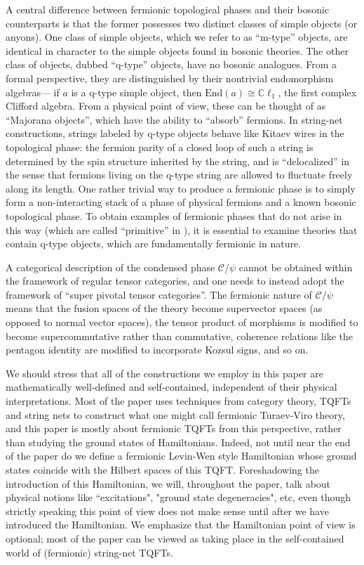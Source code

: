\documentclass[12pt,a4paper]{article}
\newcommand{\mcc}{\mathcal{C}}
\newcommand{\End}{\text{End}}
\newcommand{\cl}{\mathbb{C}\ell}
\begin{document}
A central difference between fermionic topological phases and their bosonic counterparts is that 
the former possesses two distinct classes of simple objects (or anyons). 
One class of simple objects, which we refer to as ``m-type'' objects, are identical in character
to the simple objects found in bosonic theories. 
The other class of objects, dubbed ``q-type'' objects, have no bosonic analogues. 
From a formal perspective, they are distinguished by their nontrivial endomorphism algebras---
if $a$ is a q-type simple object, then $\End(a) \cong \cl_1$, the first complex Clifford algebra. 
From a physical point of view, these can be thought of as ``Majorana objects'', which have the ability 
to ``absorb'' fermions. 
In string-net constructions, strings labeled by q-type objects behave like Kitaev wires in the 
topological phase: the fermion parity of a closed loop of such a string is determined by 
the spin structure inherited by the string, and is ``delocalized'' in the sense that fermions living on the q-type string are allowed to fluctuate freely along its length.
One rather trivial way to produce a fermionic phase is to simply form a non-interacting stack of a phase of physical fermions 
and a known bosonic topological phase. 
To obtain examples of fermionic phases that do not arise in this way (which are called ``primitive'' in \cite{Lan2016b}),
it is essential to examine theories that contain q-type objects, which are fundamentally fermionic in nature. 

A categorical description of the condensed phase $\mcc / \psi$ cannot be obtained within the framework 
of regular tensor categories, and one needs to instead adopt the framework of ``super pivotal tensor categories''. 
The fermionic nature of $\mcc / \psi$ means that the fusion spaces of the theory become supervector spaces 
(as opposed to normal vector spaces),
the tensor product of morphisms is modified to become supercommutative rather than commutative, 
coherence relations like the pentagon identity are modified to incorporate Kozsul signs, and so on.

We should stress that all of the constructions we employ in this paper are mathematically well-defined and 
self-contained, independent of their physical interpretations. 
Most of the paper uses techniques from category theory, TQFTs and string nets to construct what one
might call fermionic Turaev-Viro theory, and this paper is mostly about fermionic TQFTs from this perspective, 
rather than studying the ground states of Hamiltonians. 
Indeed, not until near the end of the paper do we define a fermionic Levin-Wen style Hamiltonian whose ground states coincide with 
the Hilbert spaces of this TQFT.
Foreshadowing the introduction of this Hamiltonian, we will, throughout the paper, talk about physical notions like ``excitations", "ground state degeneracies", 
etc, even though
strictly speaking this point of view does not make sense until after we have introduced the Hamiltonian.
We emphasize that the Hamiltonian point of view is optional; most of the paper can be viewed as taking place
in the self-contained world of (fermionic) string-net TQFTs.
\end{document}

